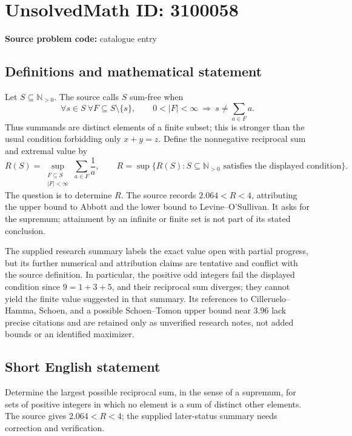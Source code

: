 \documentclass[11pt]{article}
\newcommand{\N}{\mathbb{N}}
\begin{document}
\section*{UnsolvedMath ID: 3100058}
\textbf{Source problem code:} catalogue entry
\subsection{Definitions and mathematical statement}
Let \(S\subseteq\N_{>0}\). The source calls \(S\) sum-free when
\[
\forall s\in S\ \forall F\subseteq S\setminus\{s\},\qquad
0<|F|<\infty\ \Longrightarrow\ s\ne\sum_{a\in F}a.
\]
Thus summands are distinct elements of a finite subset; this is stronger than the usual condition forbidding only \(x+y=z\). Define the nonnegative reciprocal sum and extremal value by
\[
R(S)=\sup_{\substack{F\subseteq S\\ |F|<\infty}}\sum_{a\in F}\frac1a,
\qquad
R=\sup\{R(S):S\subseteq\N_{>0}\text{ satisfies the displayed condition}\}.
\]
The question is to determine \(R\). The source records \(2.064<R<4\), attributing the upper bound to Abbott and the lower bound to Levine--O'Sullivan. It asks for the supremum; attainment by an infinite or finite set is not part of its stated conclusion.

The supplied research summary labels the exact value open with partial progress, but its further numerical and attribution claims are tentative and conflict with the source definition. In particular, the positive odd integers fail the displayed condition since \(9=1+3+5\), and their reciprocal sum diverges; they cannot yield the finite value suggested in that summary. Its references to Cilleruelo--Hamma, Schoen, and a possible Schoen--Tomon upper bound near \(3.96\) lack precise citations and are retained only as unverified research notes, not added bounds or an identified maximizer.
\subsection{Short English statement}
Determine the largest possible reciprocal sum, in the sense of a supremum, for sets of positive integers in which no element is a sum of distinct other elements. The source gives \(2.064<R<4\); the supplied later-status summary needs correction and verification.
\end{document}
